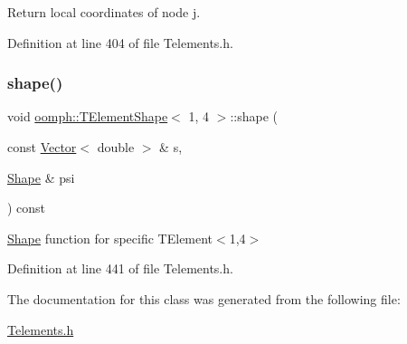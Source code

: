 Return local coordinates of node j. 



Definition at line 404 of file Telements.\+h.

\mbox{\label{classoomph_1_1TElementShape_3_011_00_014_01_4_a5e7f0f19e8e1d13052b7b6714ce69a59}} 
\subsubsection{\texorpdfstring{shape()}{shape()}}
{\footnotesize\ttfamily void \hyperlink{classoomph_1_1TElementShape}{oomph\+::\+T\+Element\+Shape}$<$ 1, 4 $>$\+::shape (\begin{DoxyParamCaption}\item[{const \hyperlink{classoomph_1_1Vector}{Vector}$<$ double $>$ \&}]{s,  }\item[{\hyperlink{classoomph_1_1Shape}{Shape} \&}]{psi }\end{DoxyParamCaption}) const\hspace{0.3cm}{\ttfamily [inline]}}



\hyperlink{classoomph_1_1Shape}{Shape} function for specific T\+Element$<$1,4$>$ 



Definition at line 441 of file Telements.\+h.



The documentation for this class was generated from the following file\+:\begin{DoxyCompactItemize}
\item 
\hyperlink{Telements_8h}{Telements.\+h}\end{DoxyCompactItemize}
